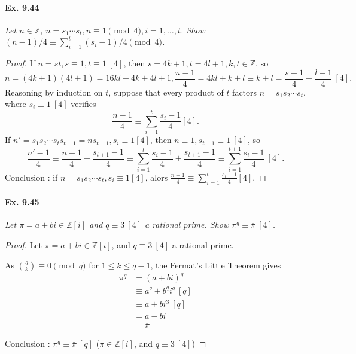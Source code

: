\documentclass[11pt,a4paper]{article}
\newcommand{\Z}{\mathbb{Z}}
\begin{document}
\paragraph{Ex. 9.44}

{\it Let $n \in \Z$, $n = s_1\cdots s_t, n\equiv 1 \pmod 4, i = 1,\ldots,t$. Show $(n-1)/4\equiv \sum_{i=1}^t (s_i-1)/4 \pmod 4$.
}

\begin{proof}
If  $n = s t , s \equiv1,t\equiv1\ [4]$, then $s = 4k+1, t = 4 l +1, k,t \in \mathbb{Z}$, so
$$n = (4k+1)(4l+1) = 16 kl + 4k+4l+1, \frac{n-1}{4} = 4 kl + k + l \equiv k+l = \frac{s-1}{4}+\frac{l-1}{4} \ [4].$$
Reasoning by induction on $t$, suppose that  every product of $t$ factors $ n = s_1s_2\cdots s_t$, where $s_i\equiv 1 \ [4]$ verifies 
$$\frac{n-1}{4} \equiv \sum\limits_{i=1}^t \frac{s_i-1}{4} [4].$$
If $n' = s_1 s_2 \cdots s_t s_{t+1} = n s_{t+1}, s_i \equiv 1[4]$, then $n\equiv1,s_{t+1} \equiv 1 \ [4]$, so
$$\frac{n'-1}{4} \equiv \frac{n-1}{4} + \frac{s_{t+1}-1}{4} \equiv \sum\limits_{i=1}^t \frac{s_i-1}{4} + \frac{s_{t+1}-1}{4} \equiv \sum\limits_{i=1}^{t+1} \frac{s_i-1}{4} \ [4].$$
Conclusion :  if  $n = s_1 s_2 \cdots s_t, s_i \equiv 1 [4]$, alors $\frac{n-1}{4} \equiv \sum\limits_{i=1}^t \frac{s_i-1}{4} [4]$.
\end{proof}

\paragraph{Ex. 9.45}

{\it Let $\pi = a + bi \in \Z[i]$ and $q\equiv 3 \ [4]$ a rational prime. Show $\pi^q \equiv \overline{\pi} \ [4]$.
}

\begin{proof}
Let $\pi=a+bi \in \mathbb{Z}[i]$, and $q\equiv 3 \ [4]$ a rational prime.

As $\binom{q}{k} \equiv 0 \pmod q$ for $1\leq k \leq q-1$, the Fermat's Little Theorem gives
\begin{align*}
\pi^q &=(a+bi)^q\\
&\equiv a^q+b^qi^q\ [q]\\
&\equiv a + b i^3 \ [q]\\
&= a-bi \\
&= \overline{\pi}
\end{align*}

Conclusion : $\pi^q \equiv \bar{\pi}\ [q]$ ($\pi \in \mathbb{Z}[i]$, and $q\equiv 3 \ [4]$)
\end{proof}
\end{document}
